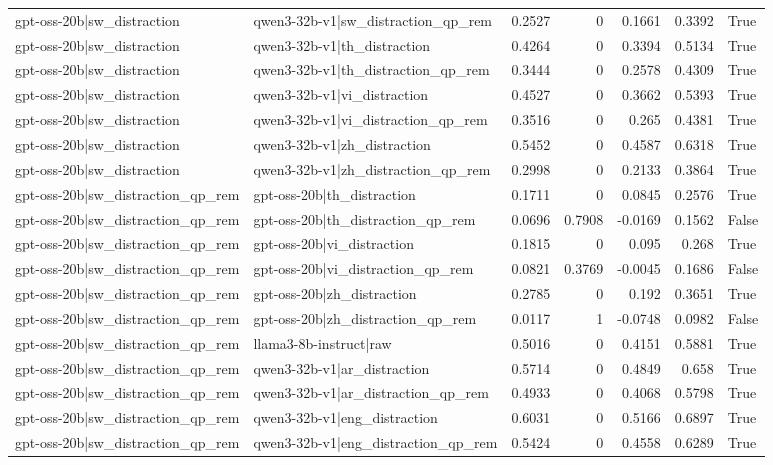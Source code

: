 \begin{table}
\begin{tabular}{l l r r r r l}
gpt-oss-20b|sw_distraction & qwen3-32b-v1|sw_distraction_qp_rem & 0.2527 & 0 & 0.1661 & 0.3392 & True \\
gpt-oss-20b|sw_distraction & qwen3-32b-v1|th_distraction & 0.4264 & 0 & 0.3394 & 0.5134 & True \\
gpt-oss-20b|sw_distraction & qwen3-32b-v1|th_distraction_qp_rem & 0.3444 & 0 & 0.2578 & 0.4309 & True \\
gpt-oss-20b|sw_distraction & qwen3-32b-v1|vi_distraction & 0.4527 & 0 & 0.3662 & 0.5393 & True \\
gpt-oss-20b|sw_distraction & qwen3-32b-v1|vi_distraction_qp_rem & 0.3516 & 0 & 0.265 & 0.4381 & True \\
gpt-oss-20b|sw_distraction & qwen3-32b-v1|zh_distraction & 0.5452 & 0 & 0.4587 & 0.6318 & True \\
gpt-oss-20b|sw_distraction & qwen3-32b-v1|zh_distraction_qp_rem & 0.2998 & 0 & 0.2133 & 0.3864 & True \\
gpt-oss-20b|sw_distraction_qp_rem & gpt-oss-20b|th_distraction & 0.1711 & 0 & 0.0845 & 0.2576 & True \\
gpt-oss-20b|sw_distraction_qp_rem & gpt-oss-20b|th_distraction_qp_rem & 0.0696 & 0.7908 & -0.0169 & 0.1562 & False \\
gpt-oss-20b|sw_distraction_qp_rem & gpt-oss-20b|vi_distraction & 0.1815 & 0 & 0.095 & 0.268 & True \\
gpt-oss-20b|sw_distraction_qp_rem & gpt-oss-20b|vi_distraction_qp_rem & 0.0821 & 0.3769 & -0.0045 & 0.1686 & False \\
gpt-oss-20b|sw_distraction_qp_rem & gpt-oss-20b|zh_distraction & 0.2785 & 0 & 0.192 & 0.3651 & True \\
gpt-oss-20b|sw_distraction_qp_rem & gpt-oss-20b|zh_distraction_qp_rem & 0.0117 & 1 & -0.0748 & 0.0982 & False \\
gpt-oss-20b|sw_distraction_qp_rem & llama3-8b-instruct|raw & 0.5016 & 0 & 0.4151 & 0.5881 & True \\
gpt-oss-20b|sw_distraction_qp_rem & qwen3-32b-v1|ar_distraction & 0.5714 & 0 & 0.4849 & 0.658 & True \\
gpt-oss-20b|sw_distraction_qp_rem & qwen3-32b-v1|ar_distraction_qp_rem & 0.4933 & 0 & 0.4068 & 0.5798 & True \\
gpt-oss-20b|sw_distraction_qp_rem & qwen3-32b-v1|eng_distraction & 0.6031 & 0 & 0.5166 & 0.6897 & True \\
gpt-oss-20b|sw_distraction_qp_rem & qwen3-32b-v1|eng_distraction_qp_rem & 0.5424 & 0 & 0.4558 & 0.6289 & True \\

\end{tabular}
\end{table}
